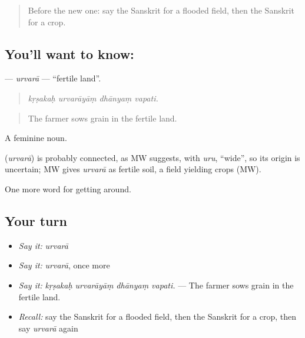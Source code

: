 \begin{quote}
Before the new one: say the Sanskrit for a flooded field, then the Sanskrit for a crop.
\end{quote}

\subsection*{You'll want to know: }
\textbf{} — \emph{urvarā} — \textquotedblleft{}fertile land\textquotedblright{}.

\begin{quote}
   
\end{quote}

\begin{quote}
\emph{kṛṣakaḥ urvarāyāṃ dhānyaṃ vapati.}
\end{quote}

\begin{quote}
The farmer sows grain in the fertile land.
\end{quote}

A feminine noun.

\begin{cousinweb}
\textbf{} (\emph{urvarā}) is probably connected, as MW suggests, with \emph{uru}, \textquotedblleft{}wide\textquotedblright{}, so its origin is uncertain; MW gives \emph{urvarā} as fertile soil, a field yielding crops (MW).
\end{cousinweb}

\begin{grammarlens}[title={What you've built}]
One more word for getting around.
\end{grammarlens}

\subsection*{Your turn}
\begin{itemize}
\raggedright
  \item \emph{Say it:} \emph{urvarā}
  \item \emph{Say it:} \emph{urvarā}, once more
  \item \emph{Say it:} \emph{kṛṣakaḥ urvarāyāṃ dhānyaṃ vapati.} — The farmer sows grain in the fertile land.
  \item \emph{Recall:} say the Sanskrit for a flooded field, then the Sanskrit for a crop, then say \emph{urvarā} again
\end{itemize}

